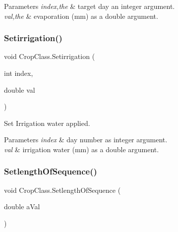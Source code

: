 \begin{DoxyParams}{Parameters}
{\em index,the} & target day an integer argument. \\
\hline
{\em val,the} & evaporation (mm) as a double argument. \\
\hline
\end{DoxyParams}
\mbox{\label{class_crop_class_a3aebb49399ede5f75a08b00b492f005c}} 
\subsubsection{\texorpdfstring{Setirrigation()}{Setirrigation()}}
{\footnotesize\ttfamily void Crop\+Class.\+Setirrigation (\begin{DoxyParamCaption}\item[{int}]{index,  }\item[{double}]{val }\end{DoxyParamCaption})\hspace{0.3cm}{\ttfamily [inline]}}



Set Irrigation water applied. 


\begin{DoxyParams}{Parameters}
{\em index} & day number as integer argument. \\
\hline
{\em val} & irrigation water (mm) as a double argument. \\
\hline
\end{DoxyParams}
\mbox{\label{class_crop_class_a9b8b8219ccadb21424f805c5e8bd087a}} 
\subsubsection{\texorpdfstring{SetlengthOfSequence()}{SetlengthOfSequence()}}
{\footnotesize\ttfamily void Crop\+Class.\+Setlength\+Of\+Sequence (\begin{DoxyParamCaption}\item[{double}]{a\+Val }\end{DoxyParamCaption})\hspace{0.3cm}{\ttfamily [inline]}}



